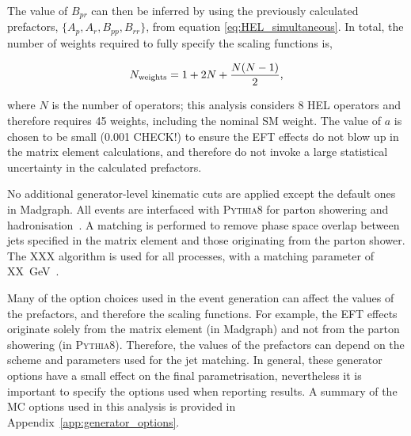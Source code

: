 \noindent
The value of $B_{pr}$ can then be inferred by using the previously calculated prefactors, $\{A_p,A_r,B_{pp},B_{rr}\}$, from equation \ref{eq:HEL_simultaneous}. In total, the number of weights required to fully specify the scaling functions is,

\begin{equation}
    N_{\rm{weights}} = 1 + 2N + \frac{N(N-1)}{2},
\end{equation}

\noindent
where $N$ is the number of operators; this analysis considers 8 HEL operators and therefore requires 45 weights, including the nominal SM weight. The value of $a$ is chosen to be small (0.001 CHECK!) to ensure the EFT effects do not blow up in the matrix element calculations, and therefore do not invoke a large statistical uncertainty in the calculated prefactors.

No additional generator-level kinematic cuts are applied except the default ones in Madgraph. All events are interfaced with \textsc{Pythia8} for parton showering and hadronisation~\cite{}. A matching is performed to remove phase space overlap between jets specified in the matrix element and those originating from the parton shower. The XXX algorithm is used for all processes, with a matching parameter of XX~GeV~\cite{}. 

Many of the option choices used in the event generation can affect the values of the prefactors, and therefore the scaling functions. For example, the EFT effects originate solely from the matrix element (in Madgraph) and not from the parton showering (in \textsc{Pythia8}). Therefore, the values of the prefactors can depend on the scheme and parameters used for the jet matching. In general, these generator options have a small effect on the final parametrisation, nevertheless it is important to specify the options used when reporting results. A summary of the MC options used in this analysis is provided in Appendix~\ref{app:generator_options}.

